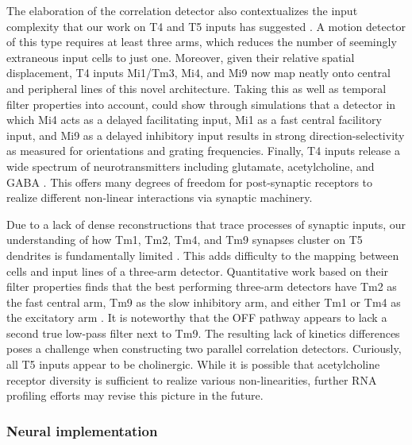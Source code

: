 The elaboration of the correlation detector also contextualizes the input complexity that our work on T4 and T5 inputs has suggested \citep{Ammer:2015jo,Serbe:2016ew}. A motion detector of this type requires at least three arms, which reduces the number of seemingly extraneous input cells to just one. Moreover, given their relative spatial displacement, T4 inputs Mi1/Tm3, Mi4, and Mi9 now map neatly onto central and peripheral lines of this novel architecture. Taking this as well as temporal filter properties into account, \citet{Arenz:2017aa} could show through simulations that a detector in which Mi4 acts as a delayed facilitating input, Mi1 as a fast central facilitory input, and Mi9 as a delayed inhibitory input results in strong direction-selectivity as measured for orientations and grating frequencies. Finally, T4 inputs release a wide spectrum of neurotransmitters including glutamate, acetylcholine, and GABA \citep{Takemura:2017aa}. This offers many degrees of freedom for post-synaptic receptors to realize different non-linear interactions via synaptic machinery.

Due to a lack of dense reconstructions that trace processes of synaptic inputs, our understanding of how Tm1, Tm2, Tm4, and Tm9 synapses cluster on T5 dendrites is fundamentally limited \citep{Shinomiya:2014dx}. This adds difficulty to the mapping between cells and input lines of a three-arm detector. Quantitative work based on their filter properties finds that the best performing three-arm detectors have Tm2 as the fast central arm, Tm9 as the slow inhibitory arm, and either Tm1 or Tm4 as the excitatory arm \citep{Arenz:2017aa}. It is noteworthy that the OFF pathway appears to lack a second true low-pass filter next to Tm9. The resulting lack of kinetics differences poses a challenge when constructing two parallel correlation detectors. Curiously, all T5 inputs appear to be cholinergic. While it is possible that acetylcholine receptor diversity is sufficient to realize various non-linearities, further RNA profiling efforts may revise this picture in the future.

\subsubsection{Neural implementation}


